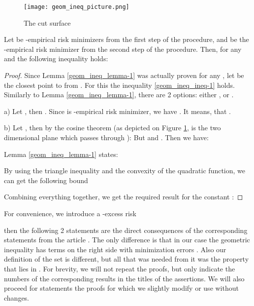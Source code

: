 \begin{figure}[ht!]
    \centering
    \texttt{[image: geom\_ineq\_picture.png]}
    \caption{The cut surface }
    \label{fig:geom_ineq_picture}
\end{figure}  



\begin{lemma}
    \label{geom_ineq}
    Let  be -empirical risk minimizers from the first step of the  procedure, and  be the -empirical risk minimizer from the second step of the  procedure. Then, for any  and  the following inequality holds:
    
\end{lemma}
\begin{proof}
    Since Lemma \ref{geom_ineq_lemma-1} was actually proven for any , let  be the closest point to  from .      
    For this  the inequality \eqref{geom_ineq_ineq-1} holds. Similarly to Lemma \ref{geom_ineq_lemma-1}, there are 2 options: either , or .
    
    a) Let , then .
    Since  is -empirical risk minimizer, we have  . It means, that .
    
    b) Let , then by the cosine theorem (as depicted on Figure \ref{fig:geom_ineq_picture},   is the two dimensional plane which passes through ): 
    But  and .
    Then we have:
    
    
    Lemma \ref{geom_ineq_lemma-1} states:
    
    By using the triangle inequality and the convexity of the quadratic function,
    we can get the following bound
    
    Combining everything together,  we get the required result for the constant :
    
\end{proof}

    For convenience, we introduce a -excess risk
    
    then the following 2 statements are the direct consequences of the corresponding statements from the article \cite{liang2015learning}. The only difference is that in our case the geometric inequality has terms on the right side with minimization errors . Also our definition of the set  is different, but all that was needed from it was the property that  lies in . For brevity, we will not repeat the proofs, but only indicate the numbers of the corresponding results in the titles of the assertions. We will also proceed for statements the proofs for which we slightly modify or use without changes.

